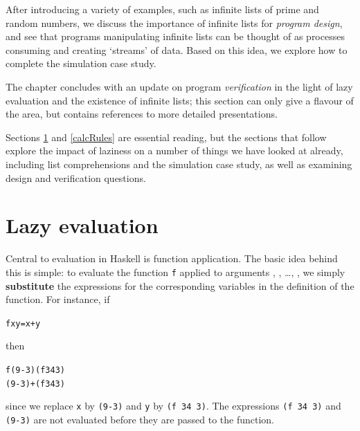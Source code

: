 After introducing a variety of examples, such as infinite lists of prime and
random numbers, we discuss the importance of infinite lists for \emph{program
design}, and see that programs manipulating infinite lists can be thought of
as processes consuming and creating `streams' of data. Based on this idea, we
explore how to complete the simulation case study.

The chapter concludes with an update on program \emph{verification} in the light of
lazy evaluation and the existence of infinite lists; this section can only
give a flavour of the area, but contains references to more detailed
presentations.

Sections \ref{lazyEval} and \ref{calcRules} are essential reading, but the sections that follow explore the impact of laziness on a number of things we have looked at already, including list comprehensions and the simulation case study, as well as examining design and verification questions.

\begin{webvideos}
\end{webvideos}

\section{Lazy evaluation}
\label{lazyEval}

Central to evaluation in Haskell is function application. The basic idea
behind this is simple: to evaluate the function \texttt{f} applied to arguments
\texttt{},  \texttt{}, \ldots , \texttt{}, we
simply \textbf{substitute} 
the expressions \texttt{} for the
corresponding variables in the definition of the function. For instance, if
\begin{alltt}
f x y = x+y
\end{alltt}
then 
\begin{alltt}
f (9-3) (f 34 3)
\step (9-3)+(f 34 3)
\end{alltt}
since we replace \texttt{x}  by \texttt{(9-3)} and \texttt{y} by \texttt{(f 34 3)}.
The expressions \texttt{(f 34 3)} and \texttt{(9-3)} are not evaluated
before they are passed to the function. 

